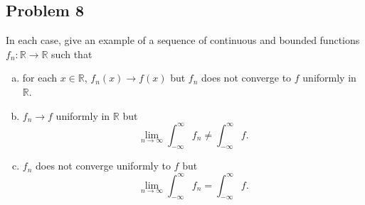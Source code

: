 \documentclass[12pt]{article}
\newcommand{\real}{\mathbb{R}}
\theoremstyle{definition}
\begin{document}
\subsection{Problem 8 \texorpdfstring{\cite{Leon}}{}}
In each case, give an example of a sequence of continuous and bounded functions $f_n : \real \to \real$ such that
\begin{enumerate}[a)]
    \item for each $x \in \real$, $f_n(x) \to f(x)$ but $f_n$ does not converge to $f$ uniformly in $\real$.
    \item $f_n \to f$ uniformly in $\real$ but
    \[
        \lim\limits_{n \to \infty} \int_{-\infty}^{\infty} f_n \neq \int_{-\infty}^{\infty} f.
    \]
    \item $f_n$ does not converge uniformly to $f$ but 
    \[
        \lim\limits_{n \to \infty} \int_{-\infty}^{\infty} f_n = \int_{-\infty}^{\infty} f.
    \]
    \end{enumerate}
\end{document}
